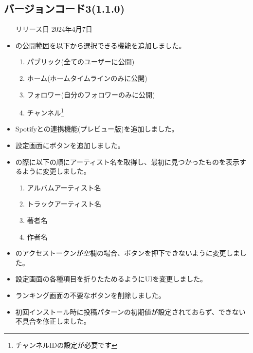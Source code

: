 \subsection*{バージョンコード3(1.1.0)}
\begin{itemize}
    \item[リリース日] 2024年4月7日
\end{itemize}

\new
\begin{itemize}
    \item \nowplaying の公開範囲を以下から選択できる機能を追加しました。
        \begin{enumerate}
            \item パブリック(全てのユーザーに公開)
            \item ホーム(ホームタイムラインのみに公開)
            \item フォロワー(自分のフォロワーのみに公開)
            \item チャンネル\footnote{チャンネルIDの設定が必要です}
        \end{enumerate}
    \item Spotifyとの連携機能(プレビュー版)を追加しました。
    \item 設定画面にボタンを追加しました。
\end{itemize}

\change
\begin{itemize}
    \item \nowplaying の際に以下の順にアーティスト名を取得し、最初に見つかったものを表示するように変更しました。
        \begin{enumerate}
            \item アルバムアーティスト名
            \item トラックアーティスト名
            \item 著者名
            \item 作者名
        \end{enumerate}
    \item \mi のアクセストークンが空欄の場合、ボタンを押下できないように変更しました。
    \item 設定画面の各種項目を折りたためるようにUIを変更しました。
\end{itemize}

\fix
\begin{itemize}
    \item ランキング画面の不要なボタンを削除しました。
    \item 初回インストール時に投稿パターンの初期値が設定されておらず、\nowplaying できない不具合を修正しました。
\end{itemize}